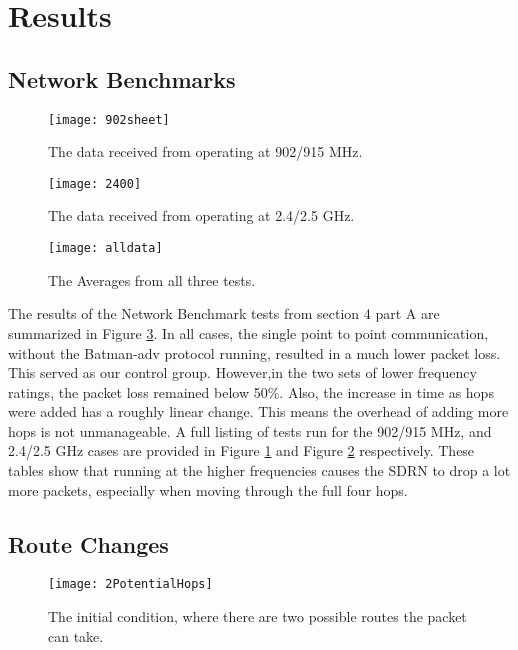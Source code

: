 \section{Results}

\subsection{Network Benchmarks}

\begin{figure}
	\centering
	\texttt{[image: 902sheet]}
	\caption{The data received from operating at 902/915 MHz.}
	\label{fig:902}
\end{figure}

\begin{figure}
	\centering
	\texttt{[image: 2400]}
	\caption{The data received from operating at 2.4/2.5 GHz.}
	\label{fig:2400}
\end{figure}

\begin{figure}
	\centering
	\texttt{[image: alldata]}
	\caption{The Averages from all three tests.}
	\label{fig:alldata}
\end{figure}

The results of the Network Benchmark tests from section 4 part A are summarized in Figure \ref{fig:alldata}. In all cases, the single point to point communication, without the Batman-adv protocol running, resulted in a much lower packet loss. This served as our control group. However,in the two sets of lower frequency ratings, the packet loss remained below 50\%. Also, the increase in time as hops were added has a roughly linear change. This means the overhead of adding more hops is not unmanageable. A full listing of tests run for the 902/915 MHz, and 2.4/2.5 GHz cases are provided in Figure \ref{fig:902} and Figure \ref{fig:2400} respectively. These tables show that running at the higher frequencies causes the SDRN to drop a lot more packets, especially when moving through the full four hops.  


\subsection{Route Changes}

\begin{figure*}
	\centering
	\texttt{[image: 2PotentialHops]}
	\caption{The initial condition, where there are two possible routes the packet can take.}
	\label{fig:2Hops}
\end{figure*}

